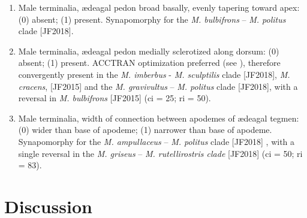 \documentclass[fleqn,10pt,lineno]{wlpeerj} %
\begin{document}
\begin{enumerate}
		\item Male terminalia, {\ae}deagal pedon broad basally, evenly tapering toward apex: (0) absent; (1) present. Synapomorphy for the \textit{M. bulbifrons} – \textit{M. politus} clade [JF2018].
		
		\item Male terminalia, {\ae}deagal pedon medially sclerotized along dorsum: (0) absent; (1) present. ACCTRAN optimization preferred (see \citealt{agnarsson2008}), therefore convergently present in the \textit{M. imberbus} - \textit{M. sculptilis} clade [JF2018], \textit{M. cracens}, [JF2015] and the \textit{M. gravivultus} – \textit{M. politus} clade [JF2018], with a reversal in \textit{M. bulbifrons} [JF2015] (ci = 25; ri = 50).
		
		\item Male terminalia, width of connection between apodemes of {\ae}deagal tegmen: (0) wider than base of apodeme; (1) narrower than base of apodeme. Synapomorphy for the \textit{M. ampullaceus} – \textit{M. politus} clade [JF2018] , with a single reversal in the \textit{M. griseus} – \textit{M. rutellirostris clade} [JF2018] (ci = 50; ri = 83).
	\end{enumerate}

\section*{Discussion}
\end{document}
